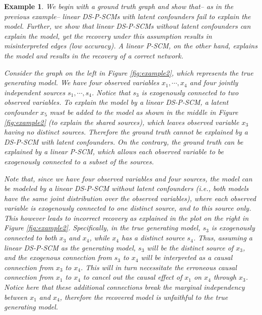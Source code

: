 \documentclass[12pt]{article}
\newtheorem{example}{Example}
\begin{document}
\begin{example} \label{example_2}
We begin with a ground truth graph and show that-- as in the previous example-- linear DS-P-SCMs with latent confounders fail to explain the model. Further, we show that linear DS-P-SCMs without latent confounders can explain the model, yet the recovery under this assumption results in misinterpreted edges (low accuracy). A linear P-SCM, on the other hand, explains the model and results in the recovery of a correct network.

Consider the graph on the left in Figure \ref{fig:example2}, which represents the true generating model. We have four observed variables $x_1,\cdots, x_4$ and four jointly independent sources $s_1,\cdots, s_4$. %
Notice that $s_3$ is exogenously connected to two observed variables. To explain the model by a linear DS-P-SCM, a latent confounder $x_5$ must be added to the model as shown in the middle in Figure \ref{fig:example2} (to explain the shared sources), which leaves observed variable $x_3$ having no distinct sources. Therefore the ground truth cannot be explained by a DS-P-SCM with latent confounders. On the contrary, the ground truth can be explained by a linear P-SCM, which allows each observed variable to be exogenously connected to a subset of the sources.

Note that, since we have four observed variables and four sources, the model can be modeled by a linear DS-P-SCM without latent confounders (i.e., both models have the same joint distribution over the observed variables), where each observed variable is exogenously connected to one distinct source, and to this source only. This however leads to incorrect recovery as explained in the plot on the right in Figure \ref{fig:example2}. Specifically, in the true generating model, $s_3$ is exogenously connected to both $x_3$ and $x_4$, while $x_4$ has a distinct source $s_4$. Thus, assuming a linear DS-P-SCM as the generating model, $s_3$ will be the distinct source of $x_3$, and the exogenous connection from $s_3$ to $x_4$ will be interpreted as a causal connection from $x_3$ to $x_4$. This will in turn necessitate the erroneous causal connection from $x_1$ to $x_4$ to cancel out the causal effect of $x_1$ on $x_4$ through $x_3$. Notice here that these additional connections break the marginal independency between $x_1$ and $x_4$, therefore the recovered model is unfaithful to the true generating model. 


\end{example}
\end{document}
